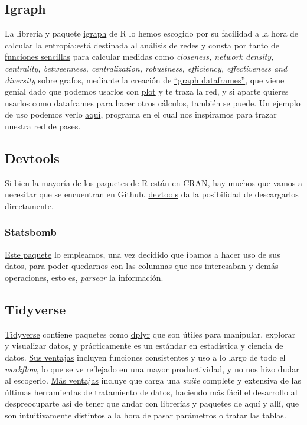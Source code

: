 \subsection{Igraph}
La librería y paquete \href{https://igraph.org/r/}{igraph} de R lo hemos escogido por su facilidad a la hora de 
calcular la entropía;está destinada al análisis de redes y consta por tanto de \href{https://kateto.net/netscix2016.html}{funciones sencillas} para calcular 
medidas como \textit{closeness, network density, centrality, betweenness, centralization, robustness, 
efficiency, effectiveness and diversity} sobre grafos, mediante la 
creación de \href{https://igraph.org/r/doc/graph_from_data_frame.html}{``graph dataframes''}, que viene genial 
dado que podemos usarlos con \href{https://www.rdocumentation.org/packages/graphics/versions/3.6.2/topics/plot}{plot} 
y te traza la red, y si aparte quieres usarlos como dataframes para hacer otros cálculos, también se puede. Un ejemplo 
de uso podemos verlo \href{https://github.com/JJ/venice-patrician-social-network/blob/main/patrician-social-network.R}{aquí}, 
programa en el cual nos inspiramos para trazar nuestra red de pases.

\subsection{Devtools}
Si bien la mayoría de los paquetes de R están en \href{https://cran.r-project.org/}{CRAN}, hay muchos que vamos 
a necesitar que se encuentran en Github. \href{https://www.r-project.org/nosvn/pandoc/devtools.html}{devtools} da 
la posibilidad de descargarlos directamente.

\subsubsection{Statsbomb}
\href{https://github.com/statsbomb/StatsBombR}{Este paquete} lo empleamos, una vez decidido que íbamos a hacer 
uso de sus datos, para poder quedarnos con las columnas que nos interesaban y demás operaciones, esto es, \textit{parsear} 
la información.

\subsection{Tidyverse}
\href{http://www.storybench.org/getting-started-with-tidyverse-in-r/}{Tidyverse} contiene paquetes como 
\href{https://dplyr.tidyverse.org/}{dplyr} que son útiles para manipular, explorar y visualizar datos, y 
prácticamente es un estándar en estadística y ciencia de datos. \href{https://rviews.rstudio.com/2017/06/08/what-is-the-tidyverse/}{Sus ventajas} 
incluyen funciones consistentes y uso a lo largo de todo el \textit{workflow}, lo que se ve reflejado en una 
mayor productividad, y no nos hizo dudar al escogerlo. \href{https://www.r-bloggers.com/2018/09/why-learn-the-tidyverse/}{Más ventajas} incluye 
que carga una \textit{suite} complete y extensiva de las últimas herramientas de tratamiento de datos, haciendo más 
fácil el desarrollo al despreocuparte así de tener que andar con librerías y paquetes de aquí y allí, que son 
intuitivamente distintos a la hora de pasar parámetros o tratar las tablas.

